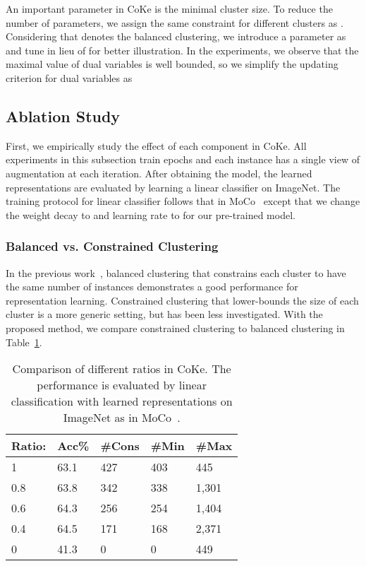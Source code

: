 \documentclass[10pt,twocolumn,letterpaper]{article}
\begin{document}
An important parameter in CoKe is the minimal cluster size. To reduce the number of parameters, we assign the same constraint for different clusters as . Considering that  denotes the balanced clustering, we introduce a parameter  as  and tune  in lieu of  for better illustration. In the experiments, we observe that the maximal value of dual variables is well bounded, so we simplify the updating criterion for dual variables as 


\subsection{Ablation Study}
First, we empirically study the effect of each component in CoKe. All experiments in this subsection train  epochs and each instance has a single view of augmentation at each iteration. After obtaining the model, the learned representations are evaluated by learning a linear classifier on ImageNet. The training protocol for linear classifier follows that in MoCo~\cite{He0WXG20} except that we change the weight decay to  and learning rate to  for our pre-trained model. 

\subsubsection{Balanced vs. Constrained Clustering}
In the previous work~\cite{AsanoRV20a,CaronMMGBJ20}, balanced clustering that constrains each cluster to have the same number of instances demonstrates a good performance for representation learning. Constrained clustering that lower-bounds the size of each cluster is a more generic setting, but has been less investigated. With the proposed method, we compare constrained clustering to balanced clustering in Table~\ref{ta:ratio}. 

\begin{table}[!ht]
\centering
\begin{tabular}{|l|l|l|l|l|}\hline
Ratio:  &Acc\%&\#Cons&\#Min&\#Max\\\hline
1 &63.1 &427&403&445\\\hline
0.8&63.8&342&338&1,301\\\hline
0.6&64.3&256&254&1,404\\\hline
0.4&64.5&171&168&2,371\\\hline
0&41.3&0&0&449\\\hline
\end{tabular}
\caption{Comparison of different ratios  in CoKe. The performance is evaluated by linear classification with learned representations on ImageNet as in MoCo~\cite{He0WXG20}.}\label{ta:ratio}
\end{table}
\end{document}

